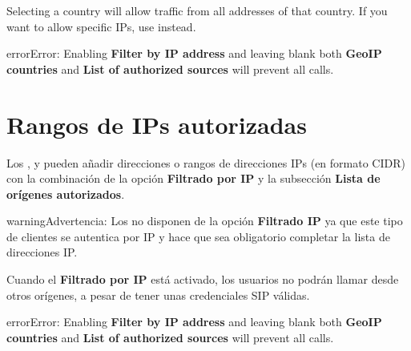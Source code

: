 \documentclass[letterpaper,10pt,spanish]{sphinxmanual}
\begin{document}
Selecting a country will allow traffic from all addresses of that country. If you want to allow specific IPs, use
{\hyperref[security_and_maintenance/security/authorized_ip_ranges:client\string-authorized\string-ip\string-ranges]{}} instead.

\begin{notice}{error}{Error:}
Enabling \textbf{Filter by IP address} and leaving blank both \textbf{GeoIP countries} and \textbf{List of authorized sources}
will prevent all calls.
\end{notice}
\label{security_and_maintenance/security/authorized_ip_ranges:client-authorized-ip-ranges}

\section{Rangos de IPs autorizadas}
\label{security_and_maintenance/security/authorized_ip_ranges:client-authorized-ip-ranges}\label{security_and_maintenance/security/authorized_ip_ranges::doc}\label{security_and_maintenance/security/authorized_ip_ranges:authorized-ip-ranges}\label{security_and_maintenance/security/authorized_ip_ranges:id1}
Los {\hyperref[administration_portal/client/vpbx/index:clientes\string-vpbx]{}}, {\hyperref[administration_portal/client/retail/index:clientes\string-retail]{}} y {\hyperref[administration_portal/client/residential/index:clientes\string-residenciales]{}} pueden añadir direcciones o rangos de direcciones IPs  (en formato CIDR) con la combinación de la opción \textbf{Filtrado por IP} y la subsección \textbf{Lista de orígenes autorizados}.

\begin{notice}{warning}{Advertencia:}
Los {\hyperref[administration_portal/client/wholesale/index:clientes\string-wholesale]{}} no disponen de la opción \textbf{Filtrado IP} ya que este tipo de clientes se autentica por IP y hace que sea obligatorio completar la lista de direcciones IP.
\end{notice}

Cuando el \textbf{Filtrado por IP} está activado, los usuarios no podrán llamar desde otros orígenes, a pesar de tener unas credenciales SIP válidas.

\begin{notice}{error}{Error:}
Enabling \textbf{Filter by IP address} and leaving blank both \textbf{GeoIP countries} and \textbf{List of authorized sources}
will prevent all calls.
\end{notice}
\end{document}

